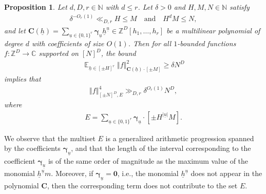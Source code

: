 \documentclass[11pt]{amsart}
\newtheorem{proposition}[lemma]{Proposition}
\theoremstyle{definition}
\DeclareMathOperator*{\E}{\mathbb{E}}
\newcommand{\C}{{\mathbb C}}
\newcommand{\N}{{\mathbb N}}
\newcommand{\Z}{{\mathbb Z}}
\newcommand{\bc}{{\textbf{C}}}
\newcommand{\bgamma}{{\boldsymbol{\gamma}}}
\newcommand{\uh}{{\underline{h}}}
\newcommand{\uu}{{\underline{u}}}
\newcommand{\norm}[1]{\left\Vert #1\right\Vert}
\begin{document}
\begin{proposition}\label{P: concatenation 1-deg}
    Let $d, D, r\in\N$ with $d\leq r$. Let $\delta>0$ and $H,M,N\in\N$ satisfy
    \begin{align}\label{E: conditions in 1-deg concatenation}
        \delta^{-O_r(1)}\ll_{D, r} H\leq M \quad \textrm{and}\quad H^d M \leq N,
    \end{align}
    and let $\bc(\uh)= \sum\limits_{\uu\in\{0,1\}^r}\bgamma_\uu \uh^\uu\in\Z^D[h_1, \ldots, h_{r}]$ be a multilinear polynomial of degree $d$ with coefficients of size $O(1)$.  Then for all $1$-bounded functions $f:\Z^D\to\C$ supported on $[N]^D$, the bound
    \begin{align}\label{E: lower bound in 1-deg concatenation}
         \E_{\uh\in[\pm H]^r}\norm{f}_{\bc(\uh)\cdot[\pm M]}^2\geq \delta N^D
    \end{align}
    implies that
    \begin{align*}
        \norm{f}_{[\pm N]^D, E}^4\gg_{D, r} \delta^{O_{r}(1)}N^D,
    \end{align*}
    where
    \begin{align}\label{E: box E}
        E = \sum_{\uu\in\{0,1\}^r}\bgamma_\uu\cdot[\pm H^{|\uu|}M].
    \end{align}
\end{proposition}
We observe that the multiset $E$ is a generalized arithmetic progression spanned by the coefficients $\bgamma_\uu$, and that the length of the interval corresponding to the coefficient $\bgamma_\uu$ is of the same order of magnitude as the maximum value of the monomial $\uh^\uu m$. Moreover, if $\bgamma_\uu = \textbf{0}$, i.e., the monomial $\uh^\uu$ does not appear in the polynomial $\bc$, then the corresponding term does not contribute to the set $E$.
\end{document}
